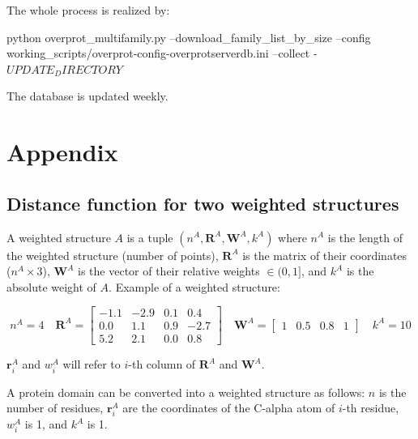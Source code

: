 \documentclass{article}
\begin{document}
The whole process is realized by:

\begin{codeblock}
    python  overprot_multifamily.py  --download_family_list_by_size
    --config working_scripts/overprot-config-overprotserverdb.ini
    --collect  -  $UPDATE_DIRECTORY                                                           $
\end{codeblock}

The database is updated weekly.



\section{Appendix} 
\label{sec:appendix}



\subsection{Distance function for two weighted structures}

A weighted structure \(A\) is a tuple
\( (n^A, \mathbf{R}^A, \mathbf{W}^A, k^A) \) where \(n^A\) is the length
of the weighted structure (number of points), \(\mathbf{R}^A\) is the
matrix of their coordinates (\(n^A \times 3\)), \(\mathbf{W}^A\) is the
vector of their relative weights \(\in (0,1]\), and \(k^A\) is the
absolute weight of \(A\). Example of a weighted structure:

\[
  n^A = 4 \quad
  \mathbf{R}^A = \begin{bmatrix}-1.1&-2.9&0.1&0.4\\0.0&1.1&0.9&-2.7\\5.2&2.1&0.0&0.8\end{bmatrix} \quad
  \mathbf{W}^A = \begin{bmatrix}1&0.5&0.8&1\end{bmatrix} \quad
  k^A = 10
\]

\(\mathbf{r}^A_i\) and \(w^A_i\) will refer to \(i\)-th column of
\(\mathbf{R}^A\) and \(\mathbf{W}^A\).

A protein domain can be converted into a weighted structure as follows:
\(n\) is the number of residues, \(\mathbf{r}^A_i\) are the coordinates of the
C-alpha atom of \(i\)-th residue, \(w^A_i\) is 1, and \(k^A\) is 1.
\end{document}
